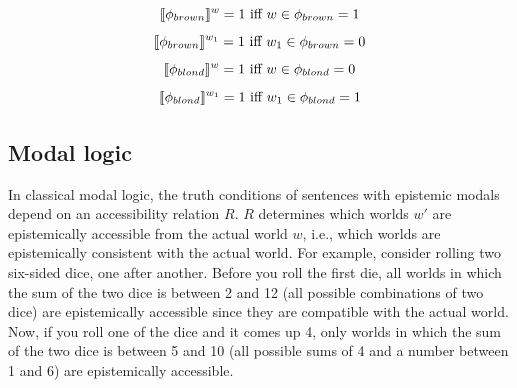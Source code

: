 $$\llbracket\phi_{brown}\rrbracket^w = 1 \mbox{ iff } w \in \phi_{brown}  = 1$$
$$\llbracket\phi_{brown}\rrbracket^{w_1} = 1 \mbox{ iff } w_1 \in \phi_{brown}  = 0$$
$$\llbracket\phi_{blond}\rrbracket^{w} = 1\mbox{ iff } w \in \phi_{blond} = 0$$
$$\llbracket\phi_{blond}\rrbracket^{w_1} = 1 \mbox{ iff } w_1 \in \phi_{blond} = 1$$

















\subsection{Modal logic}

In classical modal logic, the truth conditions of sentences with epistemic modals depend on an accessibility relation $R$.
$R$ determines which worlds $w'$ are epistemically accessible from the actual world $w$, i.e., which worlds are epistemically consistent with
the actual world. For example, consider rolling two six-sided dice, one after another. Before you roll the first die, all worlds in which the sum of
the two dice is between 2 and 12 (all possible combinations of two dice) are epistemically accessible since they are compatible with the actual
world. Now, if you roll one of the dice and it comes up 4, only worlds in which the sum of the two dice is between 5 and 10 (all possible sums of 4 and 
a number between 1 and 6) are epistemically accessible. 


